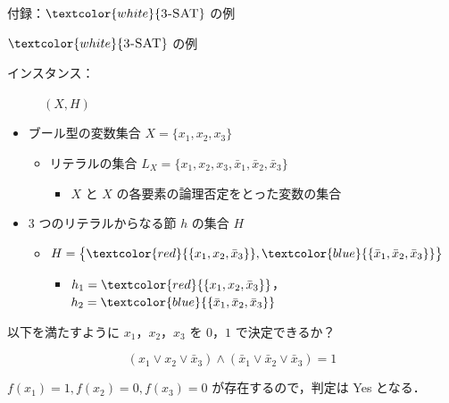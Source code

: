 \documentclass[dvipdfmx]{beamer}
\begin{document}
    \begin{frame}{付録：${\textcolor{white}{\mbox {\sc 3-SAT}}}$ の例}
      \begin{exampleblock}{${\textcolor{white}{\mbox {\sc 3-SAT}}}$ の例}
        \begin{description}
          \item[インスタンス：] $(X,H)$
          \vspace{-2mm}
        \end{description}
        \begin{itemize}
          \item ブール型の変数集合 $X=\{x_1,x_2,x_3\}$
          \begin{itemize}
            \item リテラルの集合 $L_X = \big\{ x_1,x_2,x_3,\bar x_1,\bar x_2,\bar x_3 \big\}$
            \begin{itemize}
              \item $X$ と $X$ の各要素の論理否定をとった変数の集合
            \end{itemize}
          \end{itemize}
          \item 3 つのリテラルからなる節 $h$ の集合 $H$
          \begin{itemize}
            \item $H = \big\{ \textcolor{red}{\{x_1, x_2, \bar x_3\}}, \textcolor{blue}{\{\bar x_1, \bar x_2,\bar x_3\}}\big\}$
            \begin{itemize}
              \item $h_1 = \textcolor{red}{\{x_1, x_2, \bar x_3\}}$， $h_2 = \textcolor{blue}{\{\bar x_1, \bar x_2,\bar x_3\}}$
            \end{itemize}
          \end{itemize}
        \end{itemize}
        \begin{description}
          \setlength{\leftskip}{-8mm}
          \item[問題：] 以下を満たすように $x_1$，$x_2$，$x_3$ を $0$，$1$ で決定できるか？
        \end{description}
        $$(x_1 \lor x_2 \lor \bar x_3) \land (\bar x_1 \lor \bar x_2 \lor \bar x_3) = 1$$

        $f(x_1) = 1, f(x_2) = 0, f(x_3) = 0$ が存在するので，判定は Yes となる．
      \end{exampleblock}
    \end{frame}
\end{document}
